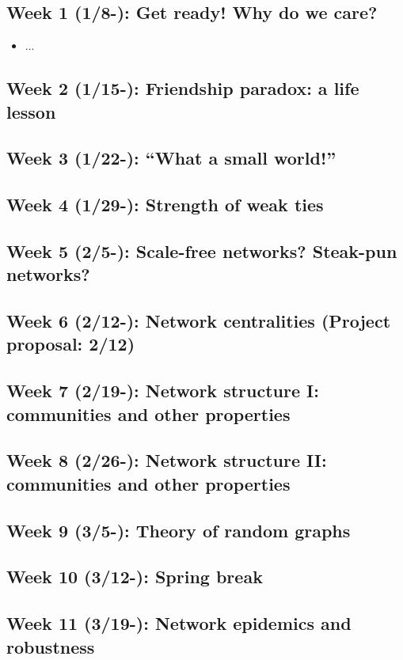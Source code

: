 \documentclass[11pt,article,oneside]{memoir} %
\begin{document}
\subsection{Week 1 (1/8-):  Get ready! Why do we care?}

\vspace{-0.2em}\begin{itemize}\itemsep0em
\item ...
\end{itemize}

\subsection{Week 2 (1/15-):  Friendship paradox: a life lesson}
\subsection{Week 3 (1/22-):  ``What a small world!''}
\subsection{Week 4 (1/29-):  Strength of weak ties}
\subsection{Week 5 (2/5-):  Scale-free networks? Steak-pun networks?}
\subsection{Week 6 (2/12-):  Network centralities (Project proposal: 2/12)}
\subsection{Week 7 (2/19-):  Network structure I: communities and other properties}
\subsection{Week 8 (2/26-):  Network structure II: communities and other properties}
\subsection{Week 9 (3/5-):  Theory of random graphs}
\subsection{\color{gray}Week 10 (3/12-): Spring break}
\subsection{Week 11 (3/19-): Network epidemics and robustness}
\end{document}
